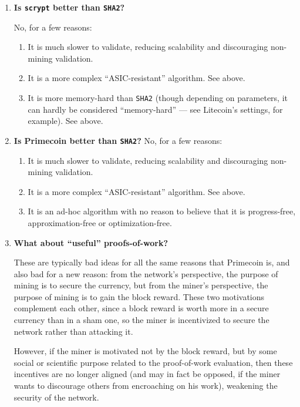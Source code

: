 \documentclass[letterpaper]{article}
\theoremstyle{xxx}
\theoremstyle{evil}
\theoremstyle{yyy}
\theoremstyle{plain}
\theoremstyle{zzz}
\begin{document}
\begin{enumerate}
\item \textbf{Is \texttt{scrypt} better than \texttt{SHA2}?}

No, for a few reasons:
\begin{enumerate}
\item It is much slower to validate, reducing scalability and discouraging
non-mining validation.
\item It is a more complex ``ASIC-resistant'' algorithm. See above.
\item It is more memory-hard than \texttt{SHA2} (though depending on parameters,
it can hardly be considered ``memory-hard'' --- see Litecoin's settings, for
example). See above.
\end{enumerate}

\item \textbf{Is Primecoin better than \texttt{SHA2}?}
No, for a few reasons:
\begin{enumerate}
\item It is much slower to validate, reducing scalability and discouraging
non-mining validation.
\item It is a more complex ``ASIC-resistant'' algorithm. See above.
\item It is an ad-hoc algorithm with no reason to believe that it is progress-free,
approximation-free or optimization-free.
\end{enumerate}

\item \textbf{What about ``useful'' proofs-of-work?}

These are typically bad ideas for all the same reasons that Primecoin is,
and also bad for a new reason: from the network's perspective, the purpose
of mining is to secure the currency, but from the miner's perspective, the
purpose of mining is to gain the block reward. These two motivations
complement each other, since a block reward is worth more in a secure
currency than in a sham one, so the miner is incentivized to secure the
network rather than attacking it.

However, if the miner is motivated not by the block reward, but by some
social or scientific purpose related to the proof-of-work evaluation,
then these incentives are no longer aligned (and may in fact be opposed,
if the miner wants to discourage others from encroaching on his work),
weakening the security of the network.

\end{enumerate}
\end{document}
